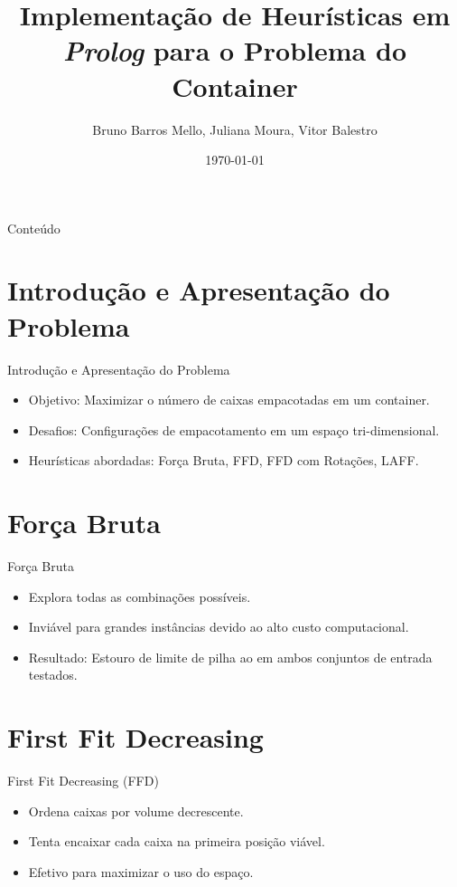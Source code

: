 \documentclass{beamer}
\title{Implementação de Heurísticas em \emph{Prolog} para o Problema do Container}
\author{Bruno Barros Mello, Juliana Moura, Vitor Balestro}
\institute{Universidade Federal Fluminense (UFF)}
\date{\today}
\begin{document}
\begin{frame}
	\titlepage
\end{frame}

\begin{frame}{Conteúdo}
	\tableofcontents
\end{frame}

\section{Introdução e Apresentação do Problema}
\begin{frame}{Introdução e Apresentação do Problema}
	\begin{itemize}
		\item Objetivo: Maximizar o número de caixas empacotadas em um container.
		\item Desafios: Configurações de empacotamento em um espaço tri-dimensional.
		\item Heurísticas abordadas: Força Bruta, FFD, FFD com Rotações, LAFF.
	\end{itemize}
\end{frame}

\section{Força Bruta}
\begin{frame}{Força Bruta}
	\begin{itemize}
		\item Explora todas as combinações possíveis.
		\item Inviável para grandes instâncias devido ao alto custo computacional.
		\item Resultado: Estouro de limite de pilha ao em ambos conjuntos de entrada testados.
	\end{itemize}
\end{frame}

\section{First Fit Decreasing}
\begin{frame}{First Fit Decreasing (FFD)}
	\begin{itemize}
		\item Ordena caixas por volume decrescente.
		\item Tenta encaixar cada caixa na primeira posição viável.
		\item Efetivo para maximizar o uso do espaço.
	\end{itemize}
\end{frame}
\end{document}
